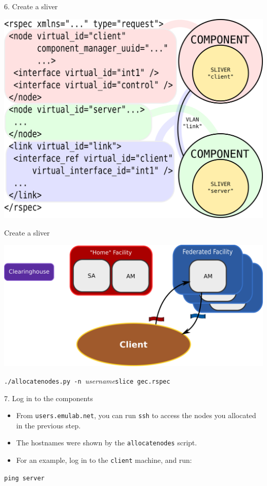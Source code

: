 \documentclass[landscape]{slides}
\newcommand{\heading}[1]{{\fontseries{b}\selectfont\begin{center}{\LARGE\color{red} #1}\end{center}}}
\newcommand{\code}[1]{\begin{center}{\tt #1}\end{center}}
\begin{document}
\begin{slide}
\heading{6. Create a sliver}
\begin{center}
\includegraphics[width=15cm]{slice}
\end{center}
\end{slide}

\begin{slide}
\heading{Create a sliver}
\begin{center}
\includegraphics[width=15cm]{tutorial-diagram-5}
\end{center}
\begin{center}{\tt ./allocatenodes.py -n }\emph{username}{\tt slice gec.rspec}\end{center}
\end{slide}

\begin{slide}
\heading{7. Log in to the components}
\begin{itemize}
\item From {\tt users.emulab.net}, you can run {\tt ssh} to access the
  nodes you allocated in the previous step.
\item The hostnames were shown by the {\tt allocatenodes} script.
\item For an example, log in to the {\tt client} machine, and run:
\end{itemize}
\code{ping server}
\end{slide}
\end{document}
